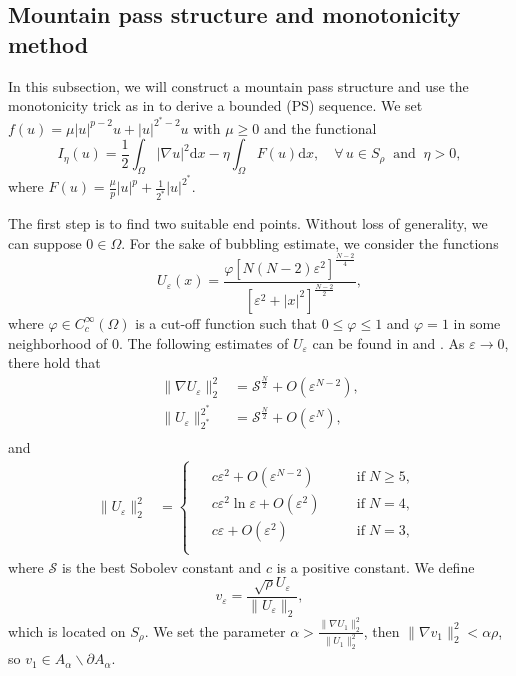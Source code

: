 \documentclass[10pt]{article}
\numberwithin{equation}{section}
\newcommand{\ud}{\mathrm{d}}
\numberwithin{equation}{section}
\begin{document}
\subsection{Mountain pass structure and monotonicity method}\label{section3.1}
In this subsection, we will construct a mountain pass structure and use the monotonicity trick as in \cite{Jeanjean99} to derive a bounded (PS) sequence. We set $f(u)=\mu |u|^{p-2}u+|u|^{2^*-2}u$ with $\mu\ge 0$ and the functional
\[
I_{\eta}(u)=\frac{1}{2}\int_{\Omega}|\nabla u|^2 \ud x
-\eta\int_{\Omega}F(u) \ud x,\quad \forall\, u\in S_\rho\;\;\mbox{and}\;\; \eta>0,
\]
where $F(u)=\frac{\mu}{p}|u|^p+\frac{1}{2^*}|u|^{2^*}$.  

The first step is to find two suitable end points. Without loss of generality, we can suppose $0\in\Omega$.  For the sake of bubbling estimate, we consider the functions
\[
U_\varepsilon(x)=\frac{\varphi [N(N-2)\varepsilon^2]^{\frac{N-2}{4}}}{[\varepsilon^2+|x|^2]^{\frac{N-2}{2}}},
\]
where $\varphi\in C_c^{\infty}(\Omega)$ is a cut-off function such that $0\le \varphi\le 1$ and $\varphi=1$ in some neighborhood of $0$. The following estimates of $U_\varepsilon$ can be found in \cite{Brezis83} and \cite[Lemma 7.1]{JL2022}. As $\varepsilon\to 0$, there hold that
\begin{equation}\label{2509112114}
\begin{aligned}
\|\nabla U_\varepsilon\|_2^2&={\mathcal{S}}^{\frac{N}{2}}+O(\varepsilon^{N-2}),\\
\|U_\varepsilon\|_{2^*}^{2^*}&={\mathcal{S}}^{\frac{N}{2}}+O(\varepsilon^{N}),\\
\end{aligned}
\end{equation}
and
\begin{equation}\label{2509112115}
\begin{aligned}
\|U_\varepsilon\|_{2}^{2}&=
\begin{cases}
\begin{aligned}
&c\varepsilon^2+O(\varepsilon^{N-2})\quad &&\mbox{if}\; N\ge 5,\\
&c\varepsilon^2\ln{\varepsilon}+O(\varepsilon^2)\quad &&\mbox{if}\; N=4,\\
&c\varepsilon+O(\varepsilon^2)\quad &&\mbox{if}\; N=3,\\
\end{aligned}
\end{cases}
\end{aligned}
\end{equation}
where ${\mathcal{S}}$ is the best Sobolev constant and $c$ is a positive constant. We define
\begin{equation}\label{2509121102}
v_\varepsilon=\frac{\sqrt{\rho}U_\varepsilon}{\|U_\varepsilon\|_2},
\end{equation}
which is located on $S_\rho$. We set the parameter $\alpha>\frac{\|\nabla U_1\|_2^2}{\|U_1\|_2^2}$, then $\|\nabla v_1\|_2^2<\alpha \rho$, so $v_1\in A_\alpha\backslash \partial A_\alpha$.  
\end{document}
